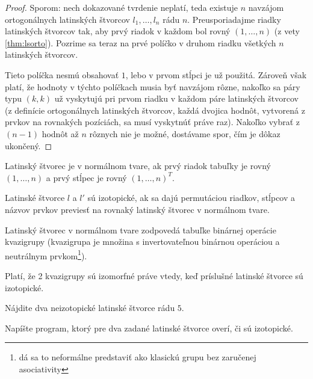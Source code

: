 \begin{toreview}
\begin{proof}
Sporom: nech dokazované tvrdenie neplatí, teda existuje $n$ navzájom ortogonálnych latinských štvorcov $l_1, \ldots, l_n$ rádu $n$.
Preusporiadajme riadky latinských štvorcov tak, aby prvý riadok v každom bol rovný $(1, \ldots, n)$ (z vety \ref{thm:lsorto}).
Pozrime sa teraz na prvé políčko v druhom riadku všetkých $n$ latinských štvorcov.

Tieto políčka nesmú obsahovať $1$, lebo v prvom stĺpci je už použitá.
Zároveň však platí, že hodnoty v týchto políčkach musia byť navzájom rôzne, nakoľko sa páry typu $(k, k)$ už vyskytujú pri prvom riadku v každom páre latinských štvorcov (z definície ortogonálnych latinských štvorcov, každá dvojica hodnôt, vytvorená z prvkov na rovnakých pozíciách, sa musí vyskytnúť práve raz).
Nakoľko vybrať z $(n-1)$ hodnôt až $n$ rôznych nie je možné, dostávame spor, čím je dôkaz ukončený.
\end{proof}
\end{toreview}

\begin{definition}
Latinský štvorec je v normálnom tvare, ak prvý riadok tabuľky je rovný $(1, \ldots, n)$ a prvý stĺpec je rovný $(1, \ldots, n)^T$.
\end{definition}

\begin{definition}
Latinské štvorce $l$ a $l'$ sú izotopické, ak sa dajú permutáciou riadkov, stĺpcov a názvov prvkov previesť na rovnaký latinský štvorec v normálnom tvare.
\end{definition}

\begin{remark}
Latinský štvorec v normálnom tvare zodpovedá tabuľke binárnej operácie kvazigrupy 
(kvazigrupa je množina s invertovateľnou binárnou operáciou a neutrálnym prvkom\footnote{dá sa to neformálne predstaviť ako klasickú grupu bez zaručenej asociativity}).

Platí, že 2 kvazigrupy sú izomorfné práve vtedy, keď príslušné latinské štvorce sú izotopické.
\end{remark}

\begin{toreview}
\begin{exercise}
Nájdite dva neizotopické latinské štvorce rádu $5$.
\end{exercise}


\begin{exercise}
Napíšte program, ktorý pre dva zadané latinské štvorce overí, či sú izotopické.
\end{exercise}

\end{toreview}

